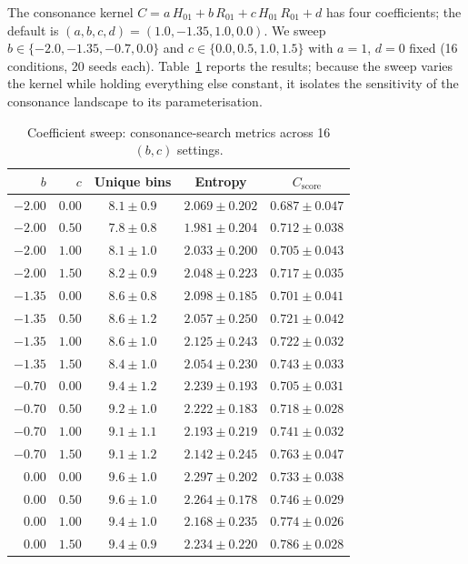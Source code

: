 \documentclass[letterpaper]{article}
\begin{document}
The consonance kernel $C = a\,H_{01} + b\,R_{01} + c\,H_{01}\,R_{01} + d$ has four coefficients; the default is $(a,b,c,d) = (1.0, {-}1.35, 1.0, 0.0)$.
We sweep $b \in \{-2.0, {-}1.35, {-}0.7, 0.0\}$ and $c \in \{0.0, 0.5, 1.0, 1.5\}$ with $a=1$, $d=0$ fixed (16 conditions, 20 seeds each).
Table~\ref{tab:coeff} reports the results; because the sweep varies the kernel while holding everything else constant, it isolates the sensitivity of the consonance landscape to its parameterisation.

\begin{table}[h]
\centering
\caption{Coefficient sweep: consonance-search metrics across 16 $(b,c)$ settings.}
\label{tab:coeff}
\footnotesize
\begin{tabular}{@{}rrccc@{}}
\toprule
$b$ & $c$ & Unique bins & Entropy & $C_{\text{score}}$ \\
\midrule
$-2.00$ & $0.00$ & $8.1 \pm 0.9$ & $2.069 \pm 0.202$ & $0.687 \pm 0.047$ \\
$-2.00$ & $0.50$ & $7.8 \pm 0.8$ & $1.981 \pm 0.204$ & $0.712 \pm 0.038$ \\
$-2.00$ & $1.00$ & $8.1 \pm 1.0$ & $2.033 \pm 0.200$ & $0.705 \pm 0.043$ \\
$-2.00$ & $1.50$ & $8.2 \pm 0.9$ & $2.048 \pm 0.223$ & $0.717 \pm 0.035$ \\
$-1.35$ & $0.00$ & $8.6 \pm 0.8$ & $2.098 \pm 0.185$ & $0.701 \pm 0.041$ \\
$-1.35$ & $0.50$ & $8.6 \pm 1.2$ & $2.057 \pm 0.250$ & $0.721 \pm 0.042$ \\
$-1.35$ & $1.00$ & $8.6 \pm 1.0$ & $2.125 \pm 0.243$ & $0.722 \pm 0.032$ \\
$-1.35$ & $1.50$ & $8.4 \pm 1.0$ & $2.054 \pm 0.230$ & $0.743 \pm 0.033$ \\
$-0.70$ & $0.00$ & $9.4 \pm 1.2$ & $2.239 \pm 0.193$ & $0.705 \pm 0.031$ \\
$-0.70$ & $0.50$ & $9.2 \pm 1.0$ & $2.222 \pm 0.183$ & $0.718 \pm 0.028$ \\
$-0.70$ & $1.00$ & $9.1 \pm 1.1$ & $2.193 \pm 0.219$ & $0.741 \pm 0.032$ \\
$-0.70$ & $1.50$ & $9.1 \pm 1.2$ & $2.142 \pm 0.245$ & $0.763 \pm 0.047$ \\
$0.00$  & $0.00$ & $9.6 \pm 1.0$ & $2.297 \pm 0.202$ & $0.733 \pm 0.038$ \\
$0.00$  & $0.50$ & $9.6 \pm 1.0$ & $2.264 \pm 0.178$ & $0.746 \pm 0.029$ \\
$0.00$  & $1.00$ & $9.4 \pm 1.0$ & $2.168 \pm 0.235$ & $0.774 \pm 0.026$ \\
$0.00$  & $1.50$ & $9.4 \pm 0.9$ & $2.234 \pm 0.220$ & $0.786 \pm 0.028$ \\
\bottomrule
\end{tabular}
\end{table}
\end{document}
